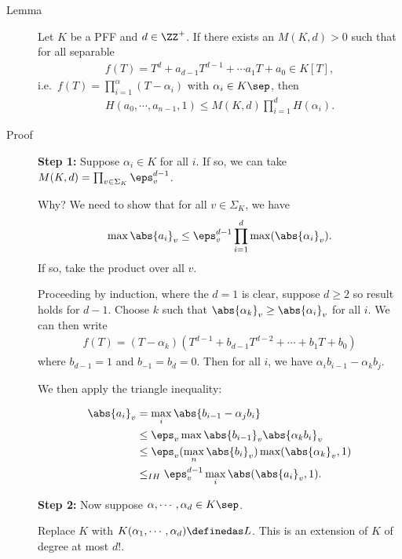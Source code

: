 \begin{description}
\item[Lemma]
Let \(K\) be a PFF and \(d\in \ZZ^+\). If there exists an
\(M(K, d) > 0\) such that for all separable
\begin{align*}
f(T) = T^d + a_{d-1}T^{d-1} + \cdots a_1 T + a_0 \in K[T]
,\end{align*} i.e.~\(f(T) = \prod_{i=1}^\alpha (T-\alpha_i)\) with
\(\alpha_i \in K\sep\), then
\begin{align*}
H(a_0, \cdots, a_{n-1}, 1) \leq M(K, d) \prod_{i=1}^d H(\alpha_i)
.\end{align*}
\item[Proof]
\textbf{Step 1:} Suppose \(\alpha_i \in K\) for all \(i\). If so, we can
take \(M(K, d) = \prod_{v\in \Sigma_K} \eps_v^{d-1}\).

Why? We need to show that for all \(v\in \Sigma_K\), we have
\begin{align*}
\max \abs{a_i}_v \leq \eps_v^{d-1} \prod_{i=1}^d \max(\abs{\alpha_i}_v)
.\end{align*} If so, take the product over all \(v\).

Proceeding by induction, where the \(d=1\) is clear, suppose \(d\geq 2\)
so result holds for \(d-1\). Choose \(k\) such that
\(\abs{\alpha_k}_v \geq \abs{\alpha_i}_v\) for all \(i\). We can then
write
\begin{align*}
f(T) = (T-\alpha_k)( T^{d-1} + b_{d-1}T^{d-2} + \cdots + b_1 T + b_0 )
\end{align*} where \(b_{d-1} = 1\) and \(b_{-1} = b_d = 0\). Then for
all \(i\), we have \(\alpha_i b_{i-1} - \alpha_k b_j\).

We then apply the triangle inequality:

\begin{align*}
\abs{a_i}_v 
&= \max_i \abs{b_{i-1} - \alpha_j b_i} \\
&\leq \eps_v  \max \abs{b_{i-1}}_v \abs{\alpha_k b_i}_v \\
&\leq \eps_v (\max_n \abs{b_i}_v) \max(\abs{\alpha_k}_v, 1) \\
&\leq_{IH} \eps_v^{d-1} \max_i \abs(\abs{a_i}_v, 1)
.\end{align*}

\textbf{Step 2:} Now suppose \(\alpha, \cdots, \alpha_d \in K\sep\).

Replace \(K\) with \(K(\alpha_1, \cdots, \alpha_d) \definedas L\). This
is an extension of \(K\) of degree at most \(d!\).


\end{description}
